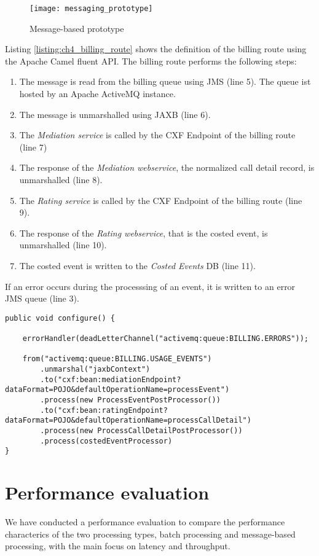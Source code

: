 \begin{figure}[h!]
	\centering
	\texttt{[image: messaging\_prototype]}
	\caption{Message-based prototype}
	\label{fig:ch4_messaging_prototype}
\end{figure}

Listing \ref{listing:ch4_billing_route} shows the definition of the billing route using the Apache Camel fluent \ac{API}.
The billing route performs the following steps:

\begin{enumerate}
	\item The message is read from the billing queue using \ac{JMS} (line 5). The queue ist hosted by an Apache ActiveMQ instance.
	\item The message is unmarshalled using \ac{JAXB} (line 6).
	\item The \emph{Mediation service} is called by the CXF Endpoint of the billing route (line 7)
	\item The response of the \emph{Mediation webservice}, the normalized call detail record, is unmarshalled (line 8). 
	\item The \emph{Rating service} is called by the CXF Endpoint of the billing route (line 9).
	\item The response of the \emph{Rating webservice}, that is the costed event, is unmarshalled (line 10).
	\item The costed event is written to the \emph{Costed Events} DB (line 11).
\end{enumerate}

If an error occurs during the processsing of an event, it is written to an error \ac{JMS} queue (line 3).

\begin{lstlisting}[caption={Billing route definition},label=listing:ch4_billing_route]
public void configure() {
		
	errorHandler(deadLetterChannel("activemq:queue:BILLING.ERRORS"));
	
	from("activemq:queue:BILLING.USAGE_EVENTS")
		.unmarshal("jaxbContext")
		.to("cxf:bean:mediationEndpoint?dataFormat=POJO&defaultOperationName=processEvent")
		.process(new ProcessEventPostProcessor())
		.to("cxf:bean:ratingEndpoint?dataFormat=POJO&defaultOperationName=processCallDetail")
		.process(new ProcessCallDetailPostProcessor())
		.process(costedEventProcessor)
}
\end{lstlisting}

\section{Performance evaluation}\label{sec:ch4_evaluation}
We have conducted a performance evaluation to compare the performance characterics of the two processing types, batch processing and message-based processing, with the main focus on latency and throughput.

